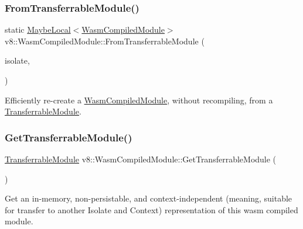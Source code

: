 \subsubsection{\texorpdfstring{From\+Transferrable\+Module()}{FromTransferrableModule()}}
{\footnotesize\ttfamily static \mbox{\hyperlink{classv8_1_1MaybeLocal}{Maybe\+Local}}$<$\mbox{\hyperlink{classv8_1_1WasmCompiledModule}{Wasm\+Compiled\+Module}}$>$ v8\+::\+Wasm\+Compiled\+Module\+::\+From\+Transferrable\+Module (\begin{DoxyParamCaption}\item[{Isolate $\ast$}]{isolate,  }\item[{const \mbox{\hyperlink{classv8_1_1WasmCompiledModule_1_1TransferrableModule}{Transferrable\+Module}} \&}]{ }\end{DoxyParamCaption})\hspace{0.3cm}{\ttfamily [static]}}

Efficiently re-\/create a \mbox{\hyperlink{classv8_1_1WasmCompiledModule}{Wasm\+Compiled\+Module}}, without recompiling, from a \mbox{\hyperlink{classv8_1_1WasmCompiledModule_1_1TransferrableModule}{Transferrable\+Module}}. \mbox{\label{classv8_1_1WasmCompiledModule_a5872dd7762bf1c1ebcef833d8356f6ad}} 
\subsubsection{\texorpdfstring{Get\+Transferrable\+Module()}{GetTransferrableModule()}}
{\footnotesize\ttfamily \mbox{\hyperlink{classv8_1_1WasmCompiledModule_1_1TransferrableModule}{Transferrable\+Module}} v8\+::\+Wasm\+Compiled\+Module\+::\+Get\+Transferrable\+Module (\begin{DoxyParamCaption}{ }\end{DoxyParamCaption})}

Get an in-\/memory, non-\/persistable, and context-\/independent (meaning, suitable for transfer to another Isolate and Context) representation of this wasm compiled module. \mbox{\label{classv8_1_1WasmCompiledModule_ad889c2d766016ebf74b7093e8b210aa2}} 
